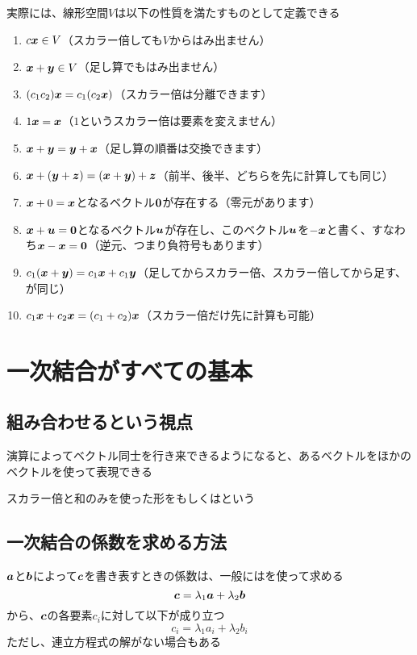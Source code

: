 \documentclass[../book_half_step_linear]{subfiles}
\begin{document}
実際には、線形空間$V$は以下の性質を満たすものとして定義できる
\begin{enumerate}
  \item $c\vb*{x} \in V$（スカラー倍しても$V$からはみ出ません）
  \item $\vb*{x}+\vb*{y} \in V$（足し算でもはみ出ません）
  \item $(c_1c_2)\vb*{x}=c_1(c_2\vb*{x})$（スカラー倍は分離できます）
  \item $1\vb*{x}=\vb*{x}$（$1$というスカラー倍は要素を変えません）
  \item $\vb*{x}+\vb*{y}=\vb*{y}+\vb*{x}$（足し算の順番は交換できます）
  \item $\vb*{x}+(\vb*{y}+\vb*{z})=(\vb*{x}+\vb*{y})+\vb*{z}$（前半、後半、どちらを先に計算しても同じ）
  \item $\vb*{x}+0=\vb*{x}$となるベクトル$\vb*{0}$が存在する（零元があります）
  \item $\vb*{x}+\vb*{u}=\vb*{0}$となるベクトル$\vb*{u}$が存在し、このベクトル$\vb*{u}$を$-\vb*{x}$と書く、すなわち$\vb*{x}-\vb*{x}=\vb*{0}$（逆元、つまり負符号もあります）
  \item $c_1(\vb*{x}+\vb*{y})=c_1\vb*{x}+c_1\vb*{y}$（足してからスカラー倍、スカラー倍してから足す、が同じ）
  \item $c_1\vb*{x}+c_2\vb*{x}=(c_1+c_2)\vb*{x}$（スカラー倍だけ先に計算も可能）
\end{enumerate}

\section{一次結合がすべての基本}

\subsection{組み合わせるという視点}

演算によってベクトル同士を行き来できるようになると、あるベクトルをほかのベクトルを使って表現できる

スカラー倍と和のみを使った形をもしくはという

\sectionline
\subsection{一次結合の係数を求める方法}

$\vb*{a}$と$\vb*{b}$によって$\vb*{c}$を書き表すときの係数は、一般にはを使って求める
\begin{equation*}
  \vb*{c} = \lambda_1 \vb*{a} + \lambda_2 \vb*{b}
\end{equation*}
から、$\vb*{c}$の各要素$c_i$に対して以下が成り立つ
\begin{equation*}
  c_i = \lambda_1 a_i + \lambda_2 b_i
\end{equation*}
ただし、連立方程式の解がない場合もある
\end{document}
